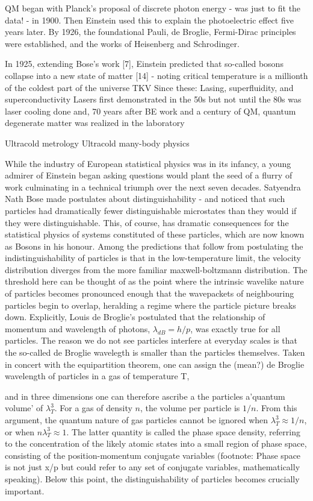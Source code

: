 QM began with Planck's proposal of discrete photon energy - was just to fit the data! - in 1900.
	Then Einstein used this to explain the photoelectric effect five years later.
	By 1926, the foundational Pauli, de Broglie, Fermi-Dirac principles were established, and the works of Heisenberg and Schrodinger.
	
	In 1925, extending Bose's work [7], Einstein predicted that so-called bosons collapse into a new state of matter [14] - noting critical temperature is a millionth of the coldest part of the universe TKV
	Since these: Lasing, superfluidity, and superconductivity 
	Lasers first demonstrated in the 50s but not until the 80s was laser cooling done and, 70 years after BE work and a century of QM, quantum degenerate matter was realized in the laboratory
	
Ultracold metrology Ultracold many-body physics


While the industry of European statistical physics was in its infancy, a	young admirer of Einstein began asking questions would plant the seed of	a flurry of work culminating in a technical triumph over the next seven	decades.
	Satyendra Nath Bose made postulates about distinguishability -	and noticed that such particles had dramatically fewer distinguishable	microstates than they would if they were distinguishable.
	This, of	course, has dramatic consequences for the statistical physics of systems	constituted of these particles, which are now known as Bosons in his	honour.
	Among the predictions that follow from postulating the	indistinguishability of particles is that in the low-temperature limit,	the velocity distribution diverges from the more familiar	maxwell-boltzmann distribution.
	The threshold here can be thought of as	the point where the intrinsic wavelike nature of particles becomes	pronounced enough that the wavepackets of neighbouring particles begin	to overlap, heralding a regime where the particle picture breaks down.	Explicitly, Louis de Broglie's postulated that the relationship of	momentum and wavelength of photons, $\lambda_{dB} = h/p$, was exactly	true for all particles.
	The reason we do not see particles interfere at	everyday scales is that the so-called de Broglie wavelegth is smaller	than the particles themselves.
	Taken in concert with the equipartition	theorem, one can assign the (mean?) de Broglie wavelength of particles	in a gas of temperature T,


	and in three dimensions one can therefore ascribe a the particles	a'quantum volume' of $\lambda_T^3$.
	For a gas of density $n$, the	volume per particle is $1/n$.
	From this argument, the quantum nature	of gas particles cannot be ignored when $\lambda_T^3 \approx 1/n$,	or when $n\lambda_T^3\approx 1$.
	The latter quantity is called the	phase space density, referring to the concentration of the likely atomic	states into a small region of phase space, consisting of the	position-momentum conjugate variables (footnote: Phase space is not just	x/p but could refer to any set of conjugate variables, mathematically	speaking).
	Below this point, the distinguishability of particles becomes	crucially important.

